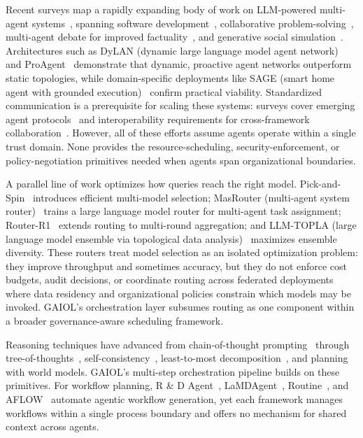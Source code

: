 \documentclass{iopjournal}
\begin{document}
Recent surveys map a rapidly expanding body of work on LLM-powered multi-agent systems~\cite{oh2015survey, dong2024large}, spanning software development~\cite{qian2024chatdev}, collaborative problem-solving~\cite{AgentVerse_EMNLP23}, multi-agent debate for improved factuality~\cite{Cooperation_NeurIPS23}, and generative social simulation~\cite{RolePlay_Nature23}. Architectures such as DyLAN (dynamic large language model agent network)~\cite{DyLAN_ICLR24} and ProAgent~\cite{ProAgent_AAAI24} demonstrate that dynamic, proactive agent networks outperform static topologies, while domain-specific deployments like SAGE (smart home agent with grounded execution)~\cite{SAGE_AAAI24} confirm practical viability. Standardized communication is a prerequisite for scaling these systems: surveys cover emerging agent protocols~\cite{AIAgentProtocols} and interoperability requirements for cross-framework collaboration~\cite{AgentInterop}. However, all of these efforts assume agents operate within a single trust domain. None provides the resource-scheduling, security-enforcement, or policy-negotiation primitives needed when agents span organizational boundaries.

A parallel line of work optimizes how queries reach the right model. Pick-and-Spin~\cite{PickAndSpin} introduces efficient multi-model selection; MasRouter (multi-agent system router)~\cite{MasRouter} trains a large language model router for multi-agent task assignment; Router-R1~\cite{RouterR1} extends routing to multi-round aggregation; and LLM-TOPLA (large language model ensemble via topological data analysis)~\cite{LLMTOPLA} maximizes ensemble diversity. These routers treat model selection as an isolated optimization problem: they improve throughput and sometimes accuracy, but they do not enforce cost budgets, audit decisions, or coordinate routing across federated deployments where data residency and organizational policies constrain which models may be invoked. GAIOL's orchestration layer subsumes routing as one component within a broader governance-aware scheduling framework.

Reasoning techniques have advanced from chain-of-thought prompting~\cite{CoT_NeurIPS22} through tree-of-thoughts~\cite{Tree_NeurIPS23}, self-consistency~\cite{SelfConsistency_ICLR23}, least-to-most decomposition~\cite{Least2Most_EMNLP22}, and planning with world models. GAIOL's multi-step orchestration pipeline builds on these primitives. For workflow planning, R \& D Agent~\cite{RDAgent}, LaMDAgent~\cite{qian2024chatdev}, Routine~\cite{Routine}, and AFLOW~\cite{AFLOW} automate agentic workflow generation, yet each framework manages workflows within a single process boundary and offers no mechanism for shared context across agents.
\end{document}
